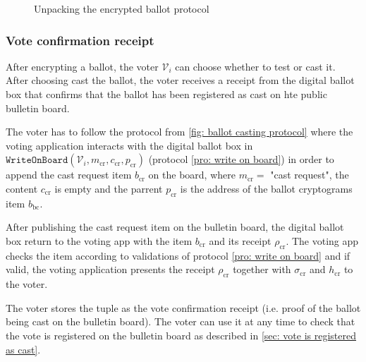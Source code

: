 \begin{landscape}
\begin{figure}[ht]
    \caption{Unpacking the encrypted ballot protocol}
    \label{fig: unpacking the encrypted ballot protocol}
\end{figure}
\end{landscape}


\clearpage
\subsubsection{Vote confirmation receipt} \label{sec: vote confirmation receipt}
After encrypting a ballot, the voter $\mathcal{V}_i$ can choose whether to test or cast it. After choosing cast the ballot, the voter receives a receipt from the digital ballot box that confirms that the ballot has been registered as cast on hte public bulletin board. 

The voter has to follow the protocol from \cref{fig: ballot casting protocol} where the voting application interacts with the digital ballot box in $\mathtt{WriteOnBoard}(\mathcal{V}_i, m_\mathrm{cr}, c_\mathrm{cr}, p_\mathrm{cr})$ (protocol \ref{pro: write on board}) in order to append the cast request item $b_\mathrm{cr}$ on the board, where $m_\mathrm{cr} =$ "cast request", the content $c_\mathrm{cr}$ is empty and the parrent $p_\mathrm{cr}$ is the address of the ballot cryptograms item $b_\mathrm{bc}$.

After publishing the cast request item on the bulletin board, the digital ballot box return to the voting app with the item $b_\mathrm{cr}$ and its receipt $\rho_\mathrm{cr}$. The voting app checks the item according to validations of protocol \ref{pro: write on board} and if valid, the voting application presents the receipt $\rho_\mathrm{cr}$ together with $\sigma_\mathrm{cr}$ and $h_\mathrm{cr}$ to the voter.

The voter stores the tuple as the vote confirmation receipt (i.e. proof of the ballot being cast on the bulletin board). The voter can use it at any time to check that the vote is registered on the bulletin board as described in \cref{sec: vote is registered as cast}.

